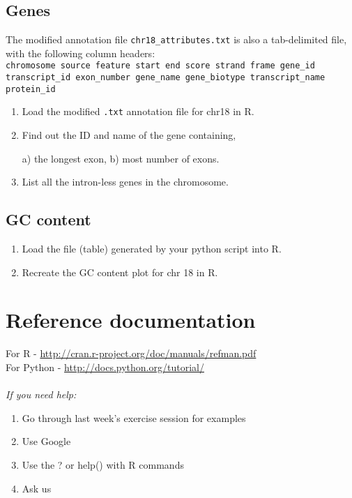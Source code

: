 \documentclass[a4paper,11pt]{article}
\begin{document}
\subsection{Genes}
The modified annotation file \texttt{chr18\_attributes.txt} is also a tab-delimited file, with the \indent following column headers: \\
\texttt {chromosome source feature start end score strand frame gene\_id transcript\_id exon\_number gene\_name gene\_biotype transcript\_name protein\_id }
\begin{enumerate}
\normalsize
\item Load the modified \texttt{.txt} annotation file for chr18 in R.
\item Find out the ID and name of the gene containing,

 a) the longest exon, b) most number of exons.
\item List all the intron-less genes in the chromosome.
\end{enumerate}
\subsection{GC content}
\begin{enumerate}
\item Load the file (table) generated by your python script into R.
\item Recreate the GC content plot for chr 18 in R.
\end{enumerate}



\section{Reference documentation}
For R - \url{http://cran.r-project.org/doc/manuals/refman.pdf}\\
\indent For Python - \url{http://docs.python.org/tutorial/}\\ \\
\indent\emph{If you need help:}
\begin{enumerate}
\item Go through last week's exercise session for examples
\item Use Google
\item Use the ? or help() with R commands
\item Ask us
\end{enumerate}
\end{document}
